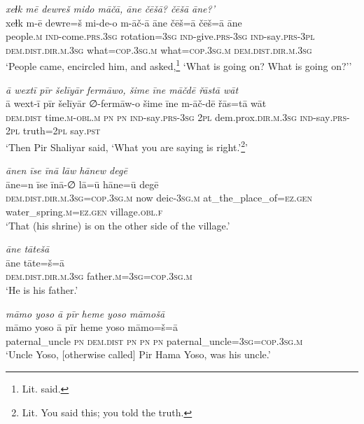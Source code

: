 \ea \label{ZP.113}
\textit{xeɫk mē dewreš mido māčā, āne čēšā? čēšā āne?’} \\ 
\gll xeɫk m-ē dewre=š mi-de-o m-āč-ā āne čēš=ā čēš=ā āne \\ 
 people\textsc{.m} \textsc{ind-}come\textsc{.prs}\textsc{.3sg} rotation\textsc{=3sg} \textsc{ind-}give\textsc{.prs}\textsc{-3sg} \textsc{ind-}say\textsc{.prs}\textsc{-3pl} \textsc{dem.dist}\textsc{.dir}\textsc{.m}\textsc{.3sg} what\textsc{=cop}\textsc{.3sg}\textsc{.m} what\textsc{=cop}\textsc{.3sg}\textsc{.m} \textsc{dem.dist}\textsc{.dir}\textsc{.m}\textsc{.3sg} \\ 
\glt `People came, encircled him, and asked,\footnote{Lit. said.} ‘What is going on? What is going on?’'
\z 
 
\ea \label{ZP.126}
\textit{ā wextī pīr šelīyār fermāwo, šime īne māčdē řāstā wāt} \\ 
\gll ā wext-ī pīr šelīyār ∅-fermāw-o šime īne m-āč-dē řās=tā wāt \\ 
 \textsc{dem.dist} time\textsc{.m}\textsc{-obl}\textsc{.m} \textsc{pn} \textsc{pn} \textsc{ind-}say\textsc{.prs}\textsc{-3sg} \textsc{2pl} dem.prox\textsc{.dir}\textsc{.m}\textsc{.3sg} \textsc{ind-}say\textsc{.prs}-\textsc{2pl} truth=\textsc{2pl} say\textsc{.pst} \\ 
\glt `Then Pir Shaliyar said, ‘What you are saying is right.’\footnote{Lit. You said this; you told the truth.}'
\z 
 
\ea \label{ŽP.6}
\textit{ānen īse īnā lāw hānew degē} \\ 
\gll āne=n īse īnā-∅ lā=ū hāne=ū degē \\ 
 \textsc{dem.dist}\textsc{.dir}\textsc{.m}\textsc{.3sg}\textsc{=cop}\textsc{.3sg}\textsc{.m} now deic\textsc{-3sg}\textsc{.m} at\_the\_place\_of\textsc{\textsc{=ez.gen}} water\_spring\textsc{.m}\textsc{\textsc{=ez.gen}} village\textsc{.obl}\textsc{.f} \\ 
\glt `That (his shrine) is on the other side of the village.'
\z 
 
\ea \label{ŽP.7}
\textit{āne tātešā} \\ 
\gll āne tāte=š=ā \\ 
 \textsc{dem.dist}\textsc{.dir}\textsc{.m}\textsc{.3sg} father\textsc{.m}\textsc{=3sg}\textsc{=cop}\textsc{.3sg}\textsc{.m} \\ 
\glt `He is his father.'
\z 
 
\ea \label{ŽP.12}
\textit{māmo yoso ā pīr heme yoso māmošā} \\ 
\gll māmo yoso ā pīr heme yoso māmo=š=ā \\ 
 paternal\_uncle \textsc{pn} \textsc{dem.dist} \textsc{pn} \textsc{pn} \textsc{pn} paternal\_uncle\textsc{=3sg}\textsc{=cop}\textsc{.3sg}\textsc{.m} \\ 
\glt `Uncle Yoso, [otherwise called] Pir Hama Yoso, was his uncle.'
\z 
 
